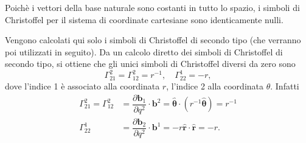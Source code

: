 \begin{example}
 Poichè i vettori della base naturale sono costanti in tutto lo spazio, i simboli di Christoffel per il sistema di coordinate cartesiane sono identicamente nulli.
\end{example}
\begin{example}
 Vengono calcolati qui solo i simboli di Christoffel di secondo tipo (che verranno poi utilizzati in seguito). Da un calcolo diretto dei simboli di Christoffel di secondo tipo, si ottiene che gli unici simboli di Christoffel diversi da zero sono
\begin{equation}
 \Gamma^2_{21} = \Gamma^2_{12} = r^{-1} , \quad \Gamma^1_{22} = - r ,
\end{equation}
dove l'indice 1 è associato alla coordinata $r$, l'indice 2 alla coordinata $\theta$. Infatti
\begin{equation}
\begin{aligned}
 \Gamma_{21}^2 = \Gamma_{12}^2  & = \dfrac{\partial \bm{b}_1}{\partial q^2} \cdot \bm{b}^2 = \bm{\hat{\theta}} \cdot (r^{-1} \bm{\hat{\theta}}) = r^{-1} \\
 \Gamma_{22}^1  & = \dfrac{\partial \bm{b}_2}{\partial q^2} \cdot \bm{b}^1 = - r \bm{\hat{r}} \cdot \bm{\hat{r}} = - r . \\
\end{aligned}
\end{equation}
\end{example}

